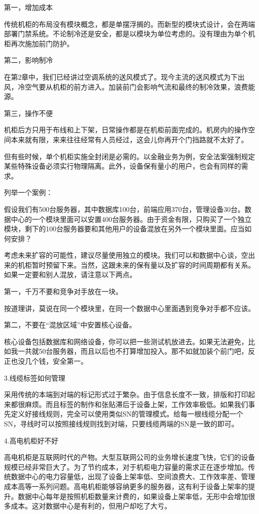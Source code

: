 \documentclass[12pt,UTF8]{ctexbook}
\begin{document}
第一，增加成本

传统机柜的布局没有模块概念，都是单摆浮搁的。而新型的模块式设计，会在两端部署门禁系统。不论制冷还是安全，都是以模块为单位考虑的。没有理由为单个机柜再次施加前门防护。

第二，影响制冷

在第2章中，我们已经讲过空调系统的送风模式了。现今主流的送风模式为下出风，冷空气要从机柜的前方进入。加装前门会影响气流和最终的制冷效果，浪费能源。

第三，操作不便

机柜后方只用于布线和上下架，日常操作都是在机柜前面完成的。机房内的操作空间本来就有限，来来往往经常有人员经过，这会儿你再开个门挡路就不太好了。

但有些时候，单个机柜实施全封闭是必需的。以金融业务为例，安全法案强制规定某些特殊设备必须实行物理隔离。此外，设备保有量小的用户，也会有同样的需求。

列举一个案例：

假设我们有500台服务器，其中数据库100台，前端应用370台，管理设备30台。数据中心的一个模块里面可以安置400台服务器。由于资金有限，只购买了一个独立模块，剩下的100台服务器要和其他用户的设备混放在另外一个模块里面。应当如何安排？

考虑未来扩容的可能性，建议尽量使用独立的模块。我们可以和数据中心谈，空出来的机柜暂时预留下来。当然，这跟未来的保有量以及扩容的时间周期都有关系。如果一定要和别人混放，请注意以下两点。

第一，千万不要和竞争对手放在一块。

按道理讲，莫说在同一个模块里，在同一个数据中心里面遇到竞争对手都不应该。

第二，不要在“混放区域”中安置核心设备。

核心设备包括数据库和网络设备，你可以把一些测试机放进去。如果无法避免，比如我一共就50台服务器，而且以后也不打算增加投入。那不如就加装个前门吧，反正也没几个钱，安全第一。

3.线缆标签如何管理

采用传统的本端到对端的标记形式过于繁杂。由于信息长度不一致，排版和打印起来都很麻烦。而且标签的制作和张贴滞后于设备上架，工作效率极低。如果我们事先定义好接线规则，完全可以使用类似SN的管理模式。给每一根线缆分配一个SN，寻线时可以按照接线规则找到对端，只要线缆两端的SN是一致的即可。

4.高电机柜好不好

高电机柜是互联网时代的产物。大型互联网公司的业务增长速度飞快，它们的设备规模已经非常巨大了。为了节约成本，对于机柜电力容量的需求正在逐步增加。传统数据中心的电力容量低，出现了设备上架率低、空间浪费大、工作效率差、管理成本高等一系列问题。高电机柜能够容纳更多的服务器，这有利于设备上架率的提升。数据中心每年是按照机柜数量来计费的，如果设备上架率低，无形中会增加很多成本。这对数据中心是有利的，但用户却吃了大亏。
\end{document}

